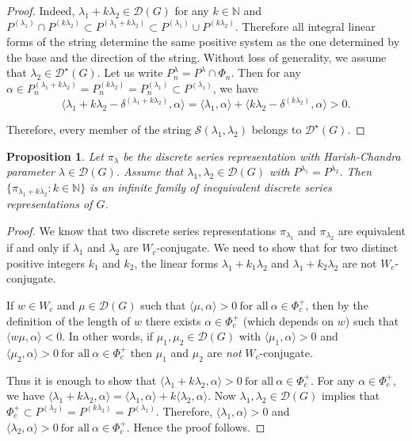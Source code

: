 \documentclass[11 pt]{amsart}
\newcommand{\N}{{\mathbb N}}
\newtheorem{proposition}[theorem]{Proposition}
\theoremstyle{definition}
\numberwithin{equation}{section}
\begin{document}
\begin{proof}
Indeed, $\lambda_1 + k \lambda_2 \in \mathcal{D}(G)$ for any $k \in \N$ and $P^{(\lambda_1)} \cap P^{(k \lambda_2)} \subset P^{(\lambda_1 + k \lambda_2)} \subset P^{(\lambda_1)} \cup P^{(k \lambda_2)}$. Therefore all integral linear forms of the string determine the same positive system as the one determined by the base and the direction of the string. Without loss of generality, we assume that $\lambda_2 \in \mathcal{D}^{\star}(G)$. Let us write $P_n^{\lambda} =P^{\lambda} \cap \Phi_n$. Then for any $\alpha \in P_n^{( \lambda_1 + k \lambda_2)} = P_n^{(k \lambda_2)} = P_n^{( \lambda_1)} \subset P^{(\lambda_1)}$, we have
$$ \langle \lambda_1 + k \lambda_2 - \delta^{(\lambda_1 + k \lambda_2)}, \alpha \rangle = \langle \lambda_1 , \alpha \rangle + \langle k \lambda_2 - \delta^{(k \lambda_2)} , \alpha \rangle > 0. $$ 

\noindent Therefore, every member of the string $\mathcal{S}(\lambda_1, \lambda_2)$ belongs to $\mathcal{D}^{\star}(G)$.
\end{proof}

\begin{proposition}
\textit{Let $\pi_{\lambda}$ be the discrete series representation with Harish-Chandra parameter $\lambda \in \mathcal{D}(G)$. Assume that $\lambda_1, \lambda_2 \in \mathcal{D}(G)$ with $P^{\lambda_1}=P^{\lambda_2}$. Then $\{ \pi_{\lambda_1 + k \lambda_2} : k \in \N \}$ is an infinite family of inequivalent discrete series representations of $G$.}
\end{proposition}

\begin{proof}
We know that two discrete series representations $\pi_{\lambda_1}$ and $\pi_{\lambda_2}$ are equivalent if and only if $\lambda_1$ and $\lambda_2$ are $W_c$-conjugate. We  need to show that for two distinct positive integers $k_1$ and $k_2$, the linear forms $\lambda_1 + k_1 \lambda_2$ and $\lambda_1 + k_2 \lambda_2$ are not $W_c$-conjugate. 

\noindent If $w \in W_c$ and $\mu \in \mathcal{D}(G)$ such that $\langle \mu , \alpha \rangle > 0\ \text{for all}\ \alpha \in \Phi_c^+$, then by the definition of the length of $w$ there exists $\alpha \in \Phi_c^+$ (which depends on $w$) such that $\langle w \mu , \alpha \rangle < 0$. In other words, if $\mu_1, \mu_2 \in \mathcal{D}(G)$ with $\langle \mu_1 , \alpha \rangle > 0$ and $ \langle \mu_2, \alpha \rangle > 0\ \text{for all}\ \alpha \in \Phi_c^+$ then $\mu_1$ and $\mu_2$ are \textit{not} $W_c$-conjugate. 

\noindent Thus it is enough to show that $\langle \lambda_1 + k \lambda_2 , \alpha \rangle > 0\ \text{for all}\ \alpha \in \Phi_c^+$. For any $\alpha \in \Phi_c^+$, we have $\langle \lambda_1 + k \lambda_2, \alpha \rangle = \langle \lambda_1 , \alpha \rangle + k \langle \lambda_2, \alpha \rangle $. Now $\lambda_1, \lambda_2 \in \mathcal{D}(G)$ implies that $\Phi_c^+ \subset P^{(\lambda_2)} = P^{(k \lambda_2)} = P^{(\lambda_1)}$. Therefore, $\langle \lambda_1 , \alpha \rangle > 0$ and $\langle \lambda_2, \alpha \rangle > 0\ \text{for all}\ \alpha \in \Phi_c^+$. Hence the proof follows.  
\end{proof}
\end{document}
